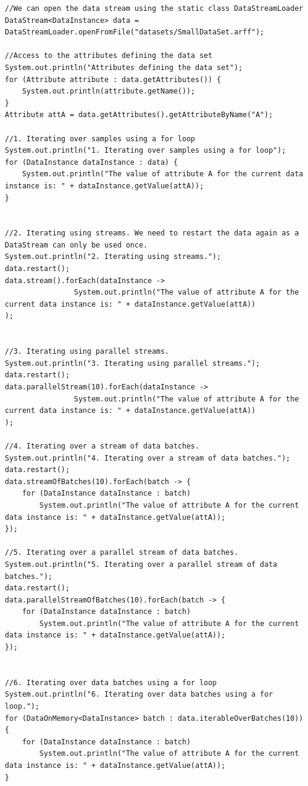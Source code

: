\begin{lstlisting}
//We can open the data stream using the static class DataStreamLoader
DataStream<DataInstance> data = DataStreamLoader.openFromFile("datasets/SmallDataSet.arff");

//Access to the attributes defining the data set
System.out.println("Attributes defining the data set");
for (Attribute attribute : data.getAttributes()) {
    System.out.println(attribute.getName());
}
Attribute attA = data.getAttributes().getAttributeByName("A");

//1. Iterating over samples using a for loop
System.out.println("1. Iterating over samples using a for loop");
for (DataInstance dataInstance : data) {
    System.out.println("The value of attribute A for the current data instance is: " + dataInstance.getValue(attA));
}


//2. Iterating using streams. We need to restart the data again as a DataStream can only be used once.
System.out.println("2. Iterating using streams.");
data.restart();
data.stream().forEach(dataInstance ->
                System.out.println("The value of attribute A for the current data instance is: " + dataInstance.getValue(attA))
);


//3. Iterating using parallel streams.
System.out.println("3. Iterating using parallel streams.");
data.restart();
data.parallelStream(10).forEach(dataInstance ->
                System.out.println("The value of attribute A for the current data instance is: " + dataInstance.getValue(attA))
);

//4. Iterating over a stream of data batches.
System.out.println("4. Iterating over a stream of data batches.");
data.restart();
data.streamOfBatches(10).forEach(batch -> {
    for (DataInstance dataInstance : batch)
        System.out.println("The value of attribute A for the current data instance is: " + dataInstance.getValue(attA));
});

//5. Iterating over a parallel stream of data batches.
System.out.println("5. Iterating over a parallel stream of data batches.");
data.restart();
data.parallelStreamOfBatches(10).forEach(batch -> {
    for (DataInstance dataInstance : batch)
        System.out.println("The value of attribute A for the current data instance is: " + dataInstance.getValue(attA));
});


//6. Iterating over data batches using a for loop
System.out.println("6. Iterating over data batches using a for loop.");
for (DataOnMemory<DataInstance> batch : data.iterableOverBatches(10)) {
    for (DataInstance dataInstance : batch)
        System.out.println("The value of attribute A for the current data instance is: " + dataInstance.getValue(attA));
}

\end{lstlisting}


